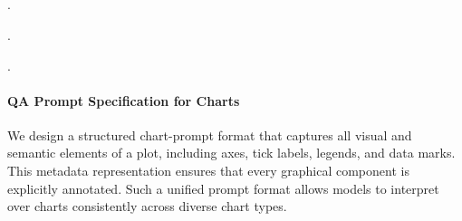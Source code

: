 \begin{tcolorbox}[prompt_structural, title=Example: Input Metadata JSON]
\hspace*{4.5em}{\}}\\
\hspace*{3em}{\},}\\[4pt]
\hspace*{3em}{\{}\\
\hspace*{4.5em}{"type": "bar",}\\
\hspace*{4.5em}{"marker\_bbox": "30",}\\
\hspace*{4.5em}{"x\_tick\_text": "2005",}\\
\hspace*{4.5em}{"x\_tick\_bbox": "31",}\\
\hspace*{4.5em}{"y\_value": 65.0,}\\
\hspace*{4.5em}{"y\_tick\_bbox": "32",}\\
\\
\hspace*{6em}{"orientation": "v", "stack\_group": null,}\\
\\
\hspace*{4.5em}{\}}\\
\hspace*{3em}{\},}\\[4pt]
\hspace*{4.5em}.

\hspace*{4.5em}.

\hspace*{4.5em}.
\end{tcolorbox}
\paragraph{QA Prompt Specification for Charts}

We design a structured chart-prompt format that captures all visual and semantic elements of a plot, including axes, tick labels, legends, and data marks. This metadata representation ensures that every graphical component is explicitly annotated. Such a unified prompt format allows models to interpret over charts consistently across diverse chart types.

